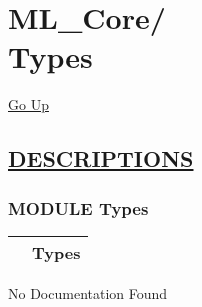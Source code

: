 \chapter*{\color{headfile}
{\large ML\_Core\slash\hspace{0pt}}
 \\
Types
}
\hypertarget{ecldoc:toc:ML_Core.Types}{}
\hyperlink{ecldoc:toc:root/ML_Core}{Go Up}


\section*{\underline{\textsf{DESCRIPTIONS}}}
\subsection*{\textsf{\colorbox{headtoc}{\color{white} MODULE}
Types}}

\hypertarget{ecldoc:ML_Core.Types}{}

{\renewcommand{\arraystretch}{1.5}
\begin{tabularx}{\textwidth}{|>{\raggedright\arraybackslash}l|X|}
\hline
\hspace{0pt}\mytexttt{\color{red} } & \textbf{Types} \\
\hline
\end{tabularx}
}

\par





No Documentation Found







